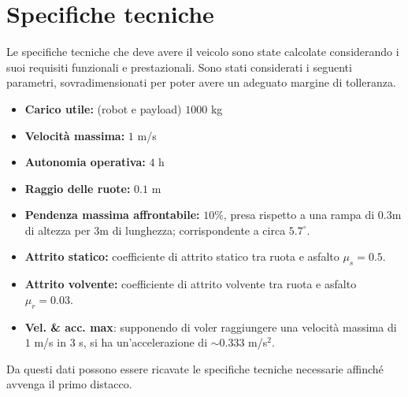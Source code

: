 \section{Specifiche tecniche}
Le specifiche tecniche che deve avere il veicolo sono state calcolate considerando i suoi requisiti funzionali e prestazionali. Sono stati considerati i seguenti parametri, sovradimensionati per poter avere un adeguato margine di tolleranza.
\begin{itemize}
    \item \textbf{Carico utile:} (robot e payload) $1000$ kg
    \item \textbf{Velocità massima:} $1$ m/s
    \item \textbf{Autonomia operativa:} $4$ h
    \item \textbf{Raggio delle ruote:} $0.1$ m
    \item \textbf{Pendenza massima affrontabile:} $10\%$, presa rispetto a una rampa di $0.3$m di altezza per $3$m di lunghezza; corrispondente a circa $5.7^\circ$.
    \item \textbf{Attrito statico:} coefficiente di attrito statico tra ruota e asfalto $\mu_s = 0.5$.
    \item \textbf{Attrito volvente:} coefficiente di attrito volvente tra ruota e asfalto $\mu_r = 0.03$.
    \item \textbf{Vel. \& acc. max}: supponendo di voler raggiungere una velocità massima di $1$ m/s in $3$ s, si ha un'accelerazione di $\sim0.333$ m/s$^2$.
\end{itemize}
Da questi dati possono essere ricavate le specifiche tecniche necessarie affinché avvenga il primo distacco.
